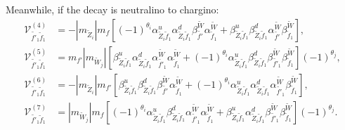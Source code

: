 \documentclass[final,3p,times]{elsarticle}
\begin{document}
Meanwhile, if the decay is neutralino to chargino:
\begin{align}
\mathcal{V}_{\tilde{f'}_1 \tilde{f}_1}^{(4)} &= -|m_{\tilde{Z}_i}|m_{f}\left[(-1)^{\theta_i}\alpha_{\tilde{Z}_i \tilde{f}_1}^{u} \alpha_{\tilde{Z}_i \tilde{f}_1}^{d} \beta_{\tilde{f'}}^{\tilde{W}}\alpha_{\tilde{f}_1}^{\tilde{W}} +  \beta_{\tilde{Z}_i \tilde{f}_1}^{u} \beta_{\tilde{Z}_i \tilde{f}_1}^{d} \alpha_{\tilde{f'}}^{\tilde{W}} \beta_{\tilde{f}_1}^{\tilde{W}}\right], \\
\mathcal{V}_{\tilde{f'}_1 \tilde{f}_1}^{(5)} &= m_{f'} |m_{\tilde{W}_j}|\left[\beta_{\tilde{Z}_i \tilde{f}_1}^{u} \alpha_{\tilde{Z}_i \tilde{f}_1}^{d} \alpha_{\tilde{f'}_1}^{\tilde{W}} \alpha_{\tilde{f}_1}^{\tilde{W}} + (-1)^{\theta_i} \alpha_{\tilde{Z}_i \tilde{f}_1}^{u} \beta_{\tilde{Z}_i \tilde{f}_1}^{d} \beta_{\tilde{f'}_1}^{\tilde{W}} \beta_{\tilde{f}_1}^{\tilde{W}}\right](-1)^{\theta_j}, \\
\mathcal{V}_{\tilde{f'}_1 \tilde{f}_1}^{(6)} &= -|m_{\tilde{Z}_i}| m_{f'} \left[\beta_{\tilde{Z}_i \tilde{f}_1}^{u} \beta_{\tilde{Z}_i \tilde{f}_1}^{d} \beta_{\tilde{f'}}^{\tilde{W}} \alpha_{\tilde{f}_1}^{\tilde{W}} + (-1)^{\theta_i}  \alpha_{\tilde{Z}_i \tilde{f}_1}^{u} \alpha_{\tilde{Z}_i \tilde{f}_1}^{d} \alpha_{\tilde{f'}_1}^{\tilde{W}} \beta_{\tilde{f}_1}^{\tilde{W}}\right], \\
\mathcal{V}_{\tilde{f'}_1 \tilde{f}_1}^{(7)} &= |m_{\tilde{W}_j}|m_{f}\left[(-1)^{\theta_i} \alpha_{\tilde{Z}_i \tilde{f}_1}^{u} \beta_{\tilde{Z}_i \tilde{f}_1}^{d} \alpha_{\tilde{f'}_1}^{\tilde{W}} \alpha_{\tilde{f}_1}^{\tilde{W}} + \beta_{\tilde{Z}_i \tilde{f}_1}^{u} \alpha_{\tilde{Z}_i \tilde{f}_1}^{d} \beta_{\tilde{f'}_1}^{\tilde{W}} \beta_{\tilde{f}_1}^{\tilde{W}}\right](-1)^{\theta_j}.
\end{align}
\end{document}

